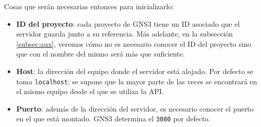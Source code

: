 Cosas que serán necesarias entonces para inicializarlo:
\begin{itemize}
\item \textbf{ID del proyecto}: cada proyecto de GNS3 tiene un ID asociado que el servidor guarda junto a su referencia. Más adelante, en la subsección \ref{subsec:aux}, veremos cómo no es necesario conocer el ID del proyecto sino que con el nombre del mismo será más que suficiente.
\item \textbf{Host}: la dirección del equipo donde el servidor está alojado. Por defecto se toma \texttt{localhost}; se supone que la mayor parte de las veces se encontrará en el mismo equipo desde el que se utiliza la API.
\item \textbf{Puerto}: además de la dirección del servidor, es necesario conocer el puerto en el que está montado. GNS3 determina el \texttt{3080} por defecto.
\end{itemize}

